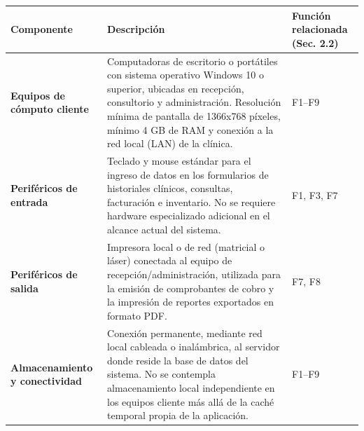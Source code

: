 \documentclass[
]{article}
\newcounter{none} %
\begin{document}
{\def\LTcaptype{none} %
\begin{longtable}[]{@{}
  >{\raggedright\arraybackslash}p{}
  >{\raggedright\arraybackslash}p{}
  >{\raggedright\arraybackslash}p{}@{}}
\toprule\noalign{}
\begin{minipage}[b]{\linewidth}\raggedright
\textbf{Componente}
\end{minipage} & \begin{minipage}[b]{\linewidth}\raggedright
\textbf{Descripción}
\end{minipage} & \begin{minipage}[b]{\linewidth}\raggedright
\textbf{Función relacionada (Sec.} \textbf{2.2)}
\end{minipage} \\
\midrule\noalign{}
\endhead
\bottomrule\noalign{}
\endlastfoot
\textbf{Equipos de cómputo cliente} &
\begin{minipage}[t]{\linewidth}\raggedright
Computadoras de escritorio o portátiles con sistema operativo Windows 10
o superior, ubicadas en recepción, consultorio y administración.
Resolución mínima de pantalla de 1366x768 píxeles, mínimo 4 GB de RAM y
conexión a la red local (LAN) de la clínica.
\end{minipage} & F1--F9 \\
\textbf{Periféricos de entrada} &
\begin{minipage}[t]{\linewidth}\raggedright
Teclado y mouse estándar para el ingreso de datos en los formularios de
historiales clínicos, consultas, facturación e inventario. No se
requiere hardware especializado adicional en el alcance actual del sistema.
\end{minipage} & F1, F3, F7 \\
\textbf{Periféricos de salida} &
\begin{minipage}[t]{\linewidth}\raggedright
Impresora local o de red (matricial o láser) conectada al equipo de
recepción/administración, utilizada para la emisión de comprobantes de
cobro y la impresión de reportes exportados en formato PDF.
\end{minipage} & F7, F8 \\
\textbf{Almacenamiento y conectividad} &
\begin{minipage}[t]{\linewidth}\raggedright
Conexión permanente, mediante red local cableada o inalámbrica, al
servidor donde reside la base de datos del sistema. No se contempla
almacenamiento local independiente en los equipos cliente más allá de la
caché temporal propia de la aplicación.
\end{minipage} & F1--F9 \\
\end{longtable}
}
\end{document}
